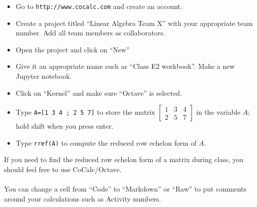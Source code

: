 


\newcommand{\drawtruss}[1][1]{%
\begin{center}
\begin{tikzpicture}[scale=#1]
\draw (0,0) -- node[left,magenta]{$1$} (1,1.71) -- node[right,magenta]{$3$} (2,0) -- node[above,magenta]{$2$} cycle;
\draw (2,0) -- node[left,magenta]{$5$} (3,1.71) -- node[above,magenta]{$4$} (1,1.71) -- cycle;
\draw (3,1.71) -- node[right,magenta]{$7$}  (4,0) -- node[above,magenta]{$6$} (2,0) -- cycle;
\draw[blue] (0,0) -- (0.25,-0.425) -- (-0.25,-0.425) -- cycle;
\draw[blue] (4,0) -- (4.25,-0.425) -- (3.75,-0.425) -- cycle;
\draw[thick,red,->] (2,0) --node[right]{10000 N} (2,-0.75);
\end{tikzpicture}
\end{center}
}


\begin{applicationActivities}


\begin{activity}{10}
\begin{itemize}
\item Go to {\tt http://www.cocalc.com} and create an account.
\item Create a project titled ``Linear Algebra Team X'' with your appropriate team number.  Add all team members as collaborators.
\item Open the project and click on ``New''
\item Give it an appropriate name such as ``Class E2 workbook''.  Make a new Jupyter notebook.
\item Click on ``Kernel'' and make sure ``Octave'' is selected.
\item Type {\tt A=[1 3 4 ; 2 5 7]} to store the matrix $\begin{bmatrix} 1 & 3 & 4 \\ 2 & 5 & 7\end{bmatrix}$ in the variable $A$; hold shift when you press enter.
\item Type {\tt rref(A)} to compute the reduced row echelon form of $A$.
\end{itemize}
\end{activity}

\begin{remark}
If you need to find the reduced row echelon form of a matrix during class, you should feel free to use CoCalc/Octave.
\ \\
\ \\
You can change a cell from ``Code'' to ``Markdown'' or ``Raw'' to put comments around your calculations such as Activity numbers.
\end{remark}


\end{applicationActivities}
